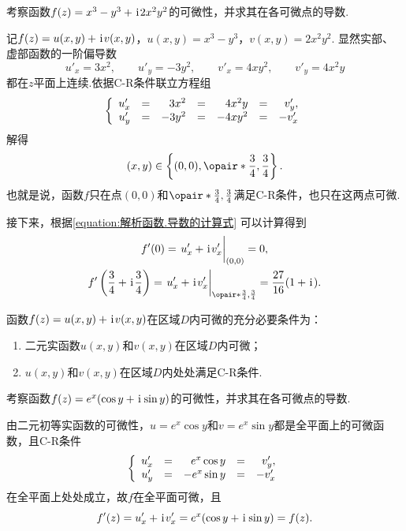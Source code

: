 \begin{example}
考察函数\(f(z) = x^3 - y^3 + \kern1pt\mathrm{i}\kern1pt 2 x^2 y^2\)的可微性，并求其在各可微点的导数.
\begin{solution}
记\(f(z) = u(x,y) + \kern1pt\mathrm{i}\kern1pt v(x,y)\)，\(u(x,y) = x^3 - y^3\)，\(v(x,y) = 2 x^2 y^2\).
显然实部、虚部函数的一阶偏导数\begin{equation*}
u'_x = 3x^2,
\qquad
u'_y = -3y^2,
\qquad
v'_x = 4xy^2,
\qquad
v'_y = 4x^2y
\end{equation*}都在\(z\)平面上连续.依据C-R条件联立方程组\begin{equation*}
\left\{ \begin{array}{*7r}
u'_x &=& 3x^2 &=& 4x^2y &=& v'_y, \\
u'_y &=& -3y^2 &=& -4xy^2 &=& -v'_x
\end{array} \right.
\end{equation*}解得\begin{equation*}
(x,y)\in\left\{ (0,0), \opair*{\frac{3}{4},\frac{3}{4}} \right\}.
\end{equation*}也就是说，函数\(f\)只在点\((0,0)\)和\(\opair*{\frac{3}{4},\frac{3}{4}}\)满足C-R条件，也只在这两点可微.

接下来，根据\cref{equation:解析函数.导数的计算式} 可以计算得到\begin{gather*}
	f'(0) = \eval{u'_x + \iu v'_x}_{(0,0)} = 0, \\
	f'\left(\frac{3}{4}+\iu\frac{3}{4}\right)
	= \eval{u'_x + \iu v'_x}_{\opair*{\frac{3}{4},\frac{3}{4}}}
	= \frac{27}{16} (1+\iu).
\end{gather*}
\end{solution}
\end{example}

\begin{theorem}\label{theorem:解析函数.函数在区域内处处可微的条件}
函数\(f(z)=u(x,y)+\kern1pt\mathrm{i}\kern1pt v(x,y)\)在区域\(D\)内可微的充分必要条件为：
\begin{enumerate}
\item 二元实函数\(u(x,y)\)和\(v(x,y)\)在区域\(D\)内可微；
\item \(u(x,y)\)和\(v(x,y)\)在区域\(D\)内处处满足C-R条件.
\end{enumerate}
\end{theorem}

\begin{example}
考察函数\(f(z) = e^x (\cos y + \kern1pt\mathrm{i}\kern1pt \sin y)\)的可微性，并求其在各可微点的导数.
\begin{solution}
由二元初等实函数的可微性，\(u = e^x \cos y\)和\(v = e^x \sin y\)都是全平面上的可微函数，且C-R条件\begin{equation*}
\left\{ \begin{array}{*5r}
u'_x &=& e^x \cos y &=& v'_y, \\
u'_y &=& - e^x \sin y &=& - v'_x
\end{array} \right.
\end{equation*}在全平面上处处成立，故\(f\)在全平面可微，且\begin{equation*}
f'(z) = u'_x + \kern1pt\mathrm{i}\kern1pt v'_x = e^x (\cos y + \kern1pt\mathrm{i}\kern1pt \sin y) = f(z).
\end{equation*}
\end{solution}
\end{example}

